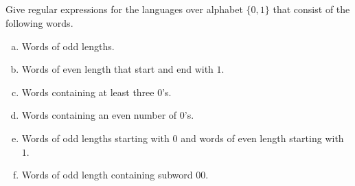\subsection{}

Give regular expressions for the languages over alphabet $\{0,1\}$ that consist of the following words.

\begin{enumerate}[(a)]
\item Words of odd lengths.
\item Words of even length that start and end with $1$.
\item Words containing at least three $0$'s.
\item Words containing an even number of $0$'s.
\item Words of odd lengths starting with $0$ and words of even length starting with $1$.
\item Words of odd length containing subword $00$.
\end{enumerate}